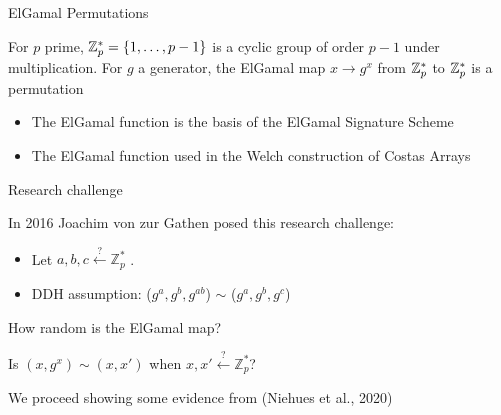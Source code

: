 
\begin{frame}{ElGamal Permutations}

For $p$ prime, $\mathbb{Z}_p^* = \{1, \ldots, p-1\}$ is a cyclic group of order $p-1$ under multiplication. For $g$ a generator, the ElGamal map $x \to g^x$ from $\mathbb{Z}_p^*$ to $\mathbb{Z}_p^*$ is a permutation
\vspace{1cm}

\begin{itemize}
\item The ElGamal function is the basis of the ElGamal Signature Scheme
  \item The ElGamal function used in the Welch construction of Costas Arrays
  \end{itemize}

  
\end{frame}




\begin{frame}{Research challenge}

In 2016 Joachim von zur Gathen posed this research challenge:

\begin{itemize}
    \item Let $a,b,c \overset{?}{\gets} \mathbb{Z}_p^*$ .
    \item DDH assumption: ($g^a, g^b, g^{ab}$) $\sim$ ($g^a, g^b, g^c$)
\end{itemize}

\pause
\vspace{10pt}
\begin{center}
    {\Large
        How random is the ElGamal map?
        
        Is $ (x, g^x) \sim  (x, x')$  when $x,x' \overset{?}{\gets} \mathbb{Z}_p^*$?
    }
\end{center}

\pause
\vspace{10pt}
    We proceed showing some evidence from (Niehues et al., 2020)

\end{frame}




